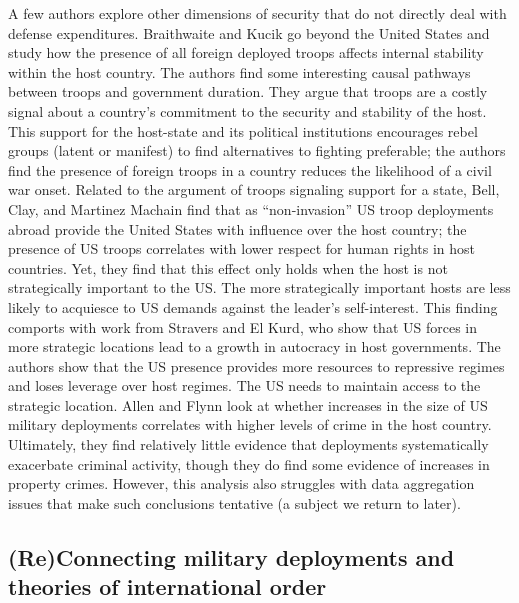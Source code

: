 A few authors explore other dimensions of security that do not directly deal with defense expenditures. Braithwaite and Kucik go beyond the United States and study how the presence of all foreign deployed troops affects internal stability within the host country.\autocite{braithwaiteandkucik2017} The authors find some interesting causal pathways between troops and government duration. They argue that troops are a costly signal about a country's commitment to the security and stability of the host. This support for the host-state and its political institutions encourages rebel groups (latent or manifest) to find alternatives to fighting preferable; the authors find the presence of foreign troops in a country reduces the likelihood of a civil war onset. Related to the argument of troops signaling support for a state, Bell, Clay, and Martinez Machain find that as ``non-invasion'' US troop deployments abroad provide the United States with influence over the host country; the presence of US troops correlates with lower respect for human rights in host countries.\autocite{bell2017} Yet, they find that this effect only holds when the host is not strategically important to the US. The more strategically important hosts are less likely to acquiesce to US demands against the leader's self-interest. This finding comports with work from Stravers and El Kurd, who show that US forces in more strategic locations lead to a growth in autocracy in host governments.\autocite{StraversElKurd2018} The authors show that the US presence provides more resources to repressive regimes and loses leverage over host regimes. The US needs to maintain access to the strategic location. Allen and Flynn look at whether increases in the size of US military deployments correlates with higher levels of crime in the host country.\autocite{allenandflynn2013} Ultimately, they find relatively little evidence that deployments systematically exacerbate criminal activity, though they do find some evidence of increases in property crimes. However, this analysis also struggles with data aggregation issues that make such conclusions tentative (a subject we return to later).


\subsection*{(Re)Connecting military deployments and theories of international order}

